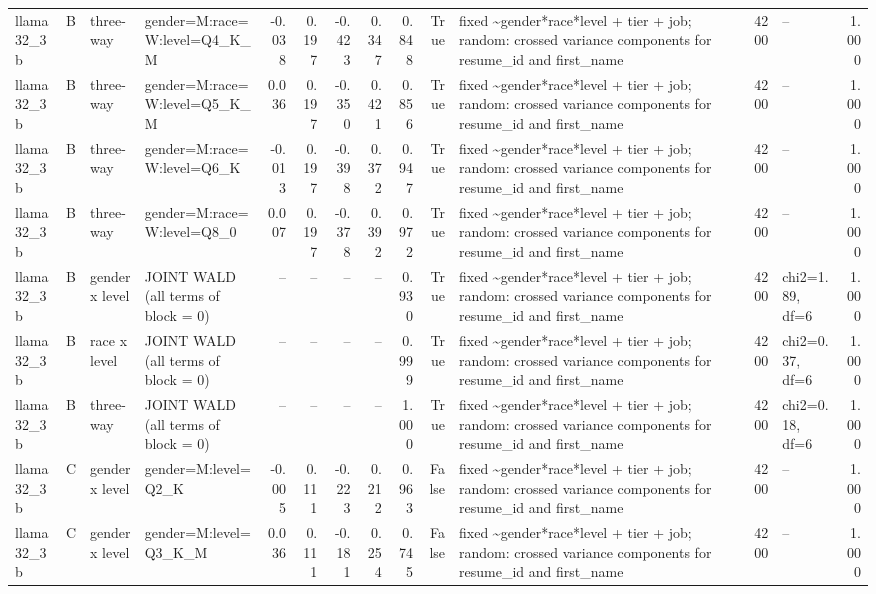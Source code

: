 \begin{tabular}{llllrrrrrrlrlr}
llama32\_3b & B & three-way & gender=M:race=W:level=Q4\_K\_M & -0.038 & 0.197 & -0.423 & 0.347 & 0.848 & True & fixed \textasciitilde \space gender*race*level + tier + job; random: crossed variance components for resume\_id and first\_name & 4200 & -- & 1.000 \\
llama32\_3b & B & three-way & gender=M:race=W:level=Q5\_K\_M & 0.036 & 0.197 & -0.350 & 0.421 & 0.856 & True & fixed \textasciitilde \space gender*race*level + tier + job; random: crossed variance components for resume\_id and first\_name & 4200 & -- & 1.000 \\
llama32\_3b & B & three-way & gender=M:race=W:level=Q6\_K & -0.013 & 0.197 & -0.398 & 0.372 & 0.947 & True & fixed \textasciitilde \space gender*race*level + tier + job; random: crossed variance components for resume\_id and first\_name & 4200 & -- & 1.000 \\
llama32\_3b & B & three-way & gender=M:race=W:level=Q8\_0 & 0.007 & 0.197 & -0.378 & 0.392 & 0.972 & True & fixed \textasciitilde \space gender*race*level + tier + job; random: crossed variance components for resume\_id and first\_name & 4200 & -- & 1.000 \\
llama32\_3b & B & gender x level & JOINT WALD (all terms of block = 0) & -- & -- & -- & -- & 0.930 & True & fixed \textasciitilde \space gender*race*level + tier + job; random: crossed variance components for resume\_id and first\_name & 4200 & chi2=1.89, df=6 & 1.000 \\
llama32\_3b & B & race x level & JOINT WALD (all terms of block = 0) & -- & -- & -- & -- & 0.999 & True & fixed \textasciitilde \space gender*race*level + tier + job; random: crossed variance components for resume\_id and first\_name & 4200 & chi2=0.37, df=6 & 1.000 \\
llama32\_3b & B & three-way & JOINT WALD (all terms of block = 0) & -- & -- & -- & -- & 1.000 & True & fixed \textasciitilde \space gender*race*level + tier + job; random: crossed variance components for resume\_id and first\_name & 4200 & chi2=0.18, df=6 & 1.000 \\
llama32\_3b & C & gender x level & gender=M:level=Q2\_K & -0.005 & 0.111 & -0.223 & 0.212 & 0.963 & False & fixed \textasciitilde \space gender*race*level + tier + job; random: crossed variance components for resume\_id and first\_name & 4200 & -- & 1.000 \\
llama32\_3b & C & gender x level & gender=M:level=Q3\_K\_M & 0.036 & 0.111 & -0.181 & 0.254 & 0.745 & False & fixed \textasciitilde \space gender*race*level + tier + job; random: crossed variance components for resume\_id and first\_name & 4200 & -- & 1.000 \\

\end{tabular}
